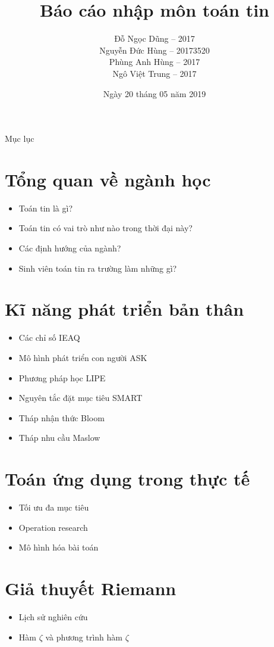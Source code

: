 \documentclass[aspectratio=43]{beamer}
\title{Báo cáo nhập môn toán tin}
\date{Ngày 20 tháng 05 năm 2019}
\author{
	Đỗ Ngọc Dũng -- 2017\\
	Nguyễn Đức Hùng -- 20173520\\
	Phùng Anh Hùng -- 2017\\
	Ngô Việt Trung -- 2017
}
\begin{document}
\begin{frame}
	\maketitle
\end{frame}

\begin{frame}{Mục lục}
\tableofcontents	
\end{frame}

\section{Tổng quan về ngành học}
\begin{frame}{\secname}	
	\begin{itemize}
		\item Toán tin là gì?
		\item Toán tin có vai trò như nào trong thời đại này?
		\item Các định hướng của ngành?
		\item Sinh viên toán tin ra trường làm những gì?
	\end{itemize}
\end{frame}

\section{Kĩ năng phát triển bản thân}
\begin{frame}{\secname}
	\begin{itemize}
		\item Các chỉ số IEAQ
		\item Mô hình phát triển con người ASK
		\item Phương pháp học LIPE
		\item Nguyên tắc đặt mục tiêu SMART
		\item Tháp nhận thức Bloom
		\item Tháp nhu cầu Maslow
	\end{itemize}	
\end{frame}

\section{Toán ứng dụng trong thực tế}
\begin{frame}{\secname}
	\begin{itemize}
		\item Tối ưu đa mục tiêu
		\item Operation research
		\item Mô hình hóa bài toán
	\end{itemize}	
\end{frame}

\begin{frame}{\secname}
	
\end{frame}

\section{Giả thuyết Riemann}
\begin{frame}{\secname}
	\begin{itemize}
		\item Lịch sử nghiên cứu
		\item Hàm $\zeta$ và phương trình hàm $\zeta$
	\end{itemize}	
\end{frame}
\end{document}
